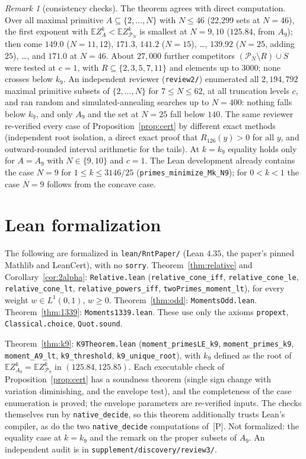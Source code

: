 \documentclass[11pt]{article}
\theoremstyle{remark}
\newtheorem{remark}[theorem]{Remark}
\newcommand{\Prm}{\mathcal{P}}
\newcommand{\E}{\mathbb{E}}
\begin{document}
\begin{remark}[consistency checks]
The theorem agrees with direct computation. Over all maximal primitive
$A\subseteq\{2,\dots,N\}$ with $N\le46$ (22{,}299 sets at $N=46$), the first exponent with
$\E Z_A^k<\E Z_{\Prm_N}^k$ is smallest at $N=9,10$ ($125.84$, from $A_9$); then come $149.0$
($N=11,12$), $171.3$, $141.2$ ($N=15$), \dots, $139.92$ ($N=25$, adding $25$), \dots, and
$171.0$ at $N=46$. About $27{,}000$ further competitors $(\Prm_N\setminus R)\cup S$ were tested at $c=1$,
with $R\subseteq\{2,3,5,7,11\}$ and elements up to $3000$; none crosses below $k_9$. An independent
reviewer (\texttt{review2/}) enumerated all $2{,}194{,}792$ maximal primitive subsets of
$\{2,\dots,N\}$ for $7\le N\le62$, at all truncation levels $c$, and ran random and
simulated-annealing searches up to $N=400$: nothing falls below $k_9$, and only $A_9$ and the
set at $N=25$ fall below $140$. The same reviewer re-verified every case of
Proposition~\ref{prop:cert} by different exact methods (independent root isolation, a direct
exact proof that $R_{126}(y)>0$ for all $y$, and outward-rounded interval arithmetic for the
tails). At $k=k_9$
equality holds only for $A=A_9$ with $N\in\{9,10\}$ and $c=1$. The Lean development already
contains the case $N=9$ for $1\le k\le3146/25$ (\texttt{primes\_minimize\_Mk\_N9}); for
$0<k<1$ the case $N=9$ follows from the concave case.
\end{remark}


\section{Lean formalization}\label{sec:lean}

The following are formalized in \texttt{lean/RntPaper/} (Lean $4.35$, the paper's pinned Mathlib and
LeanCert), with no \texttt{sorry}. Theorem~\ref{thm:relative} and Corollary~\ref{cor:2alpha}:
\texttt{Relative.lean} (\texttt{relative\_cone\_iff}, \texttt{relative\_cone\_le},
\texttt{relative\_cone\_lt}, \texttt{relative\_powers\_iff}, \texttt{twoPrimes\_moment\_lt}), for every
weight $w\in L^1(0,1)$, $w\ge0$. Theorem~\ref{thm:odd}: \texttt{MomentsOdd.lean}.
Theorem~\ref{thm:1339}: \texttt{Moments1339.lean}. These use only the axioms \texttt{propext},
\texttt{Classical.choice}, \texttt{Quot.sound}.

Theorem~\ref{thm:k9}: \texttt{K9Theorem.lean} (\texttt{moment\_primesLE\_k9}, \texttt{moment\_primes\_k9},
\texttt{moment\_A9\_lt}, \texttt{k9\_threshold}, \texttt{k9\_unique\_root}), with $k_9$ defined as the
root of $\E Z_{A_9}^k=\E Z_{\Prm_9}^k$ in $(125.84,125.85)$. Each executable check of
Proposition~\ref{prop:cert} has a soundness theorem (single sign change with variation
diminishing, and the envelope test), and the completeness of the case enumeration is proved; the
envelope parameters are re-verified inputs. The checks themselves run by \texttt{native\_decide},
so this theorem additionally trusts Lean's compiler, as do the two \texttt{native\_decide}
computations of~[P]. Not formalized: the equality case at $k=k_9$ and the remark on the proper
subsets of $A_9$. An independent audit is in \texttt{supplement/discovery/review3/}.
\end{document}
